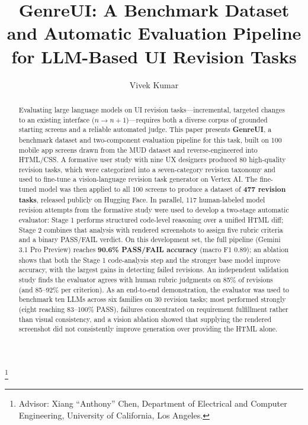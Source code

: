 \documentclass[sigconf,nonacm]{acmart}
\begin{document}
\title{GenreUI: A Benchmark Dataset and Automatic Evaluation Pipeline for LLM-Based UI Revision Tasks}

\author{Vivek Kumar}
\thanks{Advisor: Xiang ``Anthony'' Chen, Department of Electrical and Computer Engineering, University of California, Los Angeles.}

\begin{abstract}
Evaluating large language models on UI revision tasks—incremental, targeted changes to an existing interface ($n \to n+1$)—requires both a diverse corpus of grounded starting screens and a reliable automated judge. This paper presents \textbf{GenreUI}, a benchmark dataset and two-component evaluation pipeline for this task, built on 100 mobile app screens drawn from the MUD dataset and reverse-engineered into HTML/CSS. A formative user study with nine UX designers produced 80 high-quality revision tasks, which were categorized into a seven-category revision taxonomy and used to fine-tune a vision-language revision task generator on Vertex AI. The fine-tuned model was then applied to all 100 screens to produce a dataset of \textbf{477 revision tasks}, released publicly on Hugging Face. In parallel, 117 human-labeled model revision attempts from the formative study were used to develop a two-stage automatic evaluator: Stage 1 performs structured code-level reasoning over a unified HTML diff; Stage 2 combines that analysis with rendered screenshots to assign five rubric criteria and a binary PASS/FAIL verdict. On this development set, the full pipeline (Gemini 3.1 Pro Preview) reaches \textbf{90.6\% PASS/FAIL accuracy} (macro F1 0.89); an ablation shows that both the Stage 1 code-analysis step and the stronger base model improve accuracy, with the largest gains in detecting failed revisions. An independent validation study finds the evaluator agrees with human rubric judgments on 85\% of revisions (and 85--92\% per criterion). As an end-to-end demonstration, the evaluator was used to benchmark ten LLMs across six families on 30 revision tasks; most performed strongly (eight reaching 83--100\% PASS), failures concentrated on requirement fulfillment rather than visual consistency, and a vision ablation showed that supplying the rendered screenshot did not consistently improve generation over providing the HTML alone.
\end{abstract}
\end{document}
